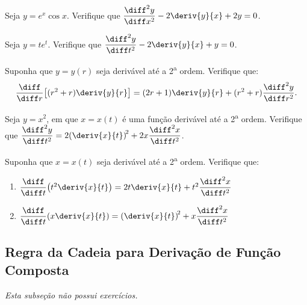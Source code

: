 \begin{exercicio}[12]
Seja $y = e^x \cos x$. Verifique que $\dfrac{\diff^2 y}{\diff x^2} - 2\deriv{y}{x} + 2y = 0$.
\end{exercicio}

\begin{exercicio}[13]
Seja $y = te^t$. Verifique que $\dfrac{\diff^2 y}{\diff t^2} - 2\deriv{y}{x} + y = 0$.
\end{exercicio}

\begin{exercicio}[14]
Suponha que $y = y(r)$ seja derivável até a 2\textsuperscript{a} ordem. Verifique que:
\[
\frac{\diff}{\diff r}\!\left[(r^2 + r)\deriv{y}{r}\right] = (2r + 1)\deriv{y}{r} + (r^2 + r)\frac{\diff^2 y}{\diff r^2}.
\]
\end{exercicio}

\begin{exercicio}[15]
Seja $y = x^2$, em que $x = x(t)$ é uma função derivável até a 2\textsuperscript{a} ordem. Verifique que $\dfrac{\diff^2 y}{\diff t^2} = 2\!\left(\deriv{x}{t}\right)^{\!2} + 2x\dfrac{\diff^2 x}{\diff t^2}$.
\end{exercicio}

\begin{exercicio}[16]
Suponha que $x = x(t)$ seja derivável até a 2\textsuperscript{a} ordem. Verifique que:
\begin{enumerate}[label=\alph*)]
    \item $\dfrac{\diff}{\diff t}\!\left(t^2 \deriv{x}{t}\right) = 2t\deriv{x}{t} + t^2 \dfrac{\diff^2 x}{\diff t^2}$
    \item $\dfrac{\diff}{\diff t}\!\left(x \deriv{x}{t}\right) = \left(\deriv{x}{t}\right)^{\!2} + x\dfrac{\diff^2 x}{\diff t^2}$
\end{enumerate}
\end{exercicio}

\clearpage

\subsection{Regra da Cadeia para Derivação de Função Composta}
\textit{Esta subseção não possui exercícios.}

\clearpage

